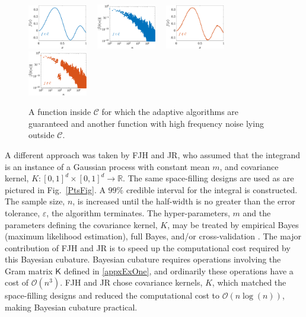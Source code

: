 \documentclass[11pt]{NSFamsart}
\newcommand{\reals}{{\mathbb{R}}}
\newcommand{\mK}{\mathsf{K}}
\newcommand{\cc}{\mathcal{C}}
\newcommand{\Order}{\mathcal{O}}
\begin{document}
\begin{figure}[ht]
	\centering
	\includegraphics[width = 0.23\textwidth] 
	{ProgramsImages/FunctionWalshFourierCoeffDecay.eps} \ \ 
	\includegraphics[width = 0.23\textwidth] 
	{ProgramsImages/WalshFourierCoeffDecay128.eps} \ \ 
	\includegraphics[width = 0.23\textwidth] 
	{ProgramsImages/FilteredFunctionWalshFourierCoeffDecay.eps} \ \ 
	\includegraphics[width = 0.23\textwidth] 
	{ProgramsImages/WalshFourierCoeffDecayFilter.eps}
	\caption{A function inside $\cc$ for which the adaptive algorithms are guaranteed and another function with high frequency noise lying outside $\cc$.
	\label{GoodBadWalshFig}}
\end{figure}
\fi

A different approach was taken by FJH and JR, who assumed that the integrand is an instance of a Gaussian process with constant mean $m$, and covariance kernel, $K:[0,1]^d \times [0,1]^d \to \reals$.  The same space-filling designs are used as are pictured in Fig.\ \ref{PtsFig}.  A $99\%$ credible interval for the integral is constructed.  The sample size, $n$, is increased until the half-width is no greater than the error tolerance, $\varepsilon$, the algorithm terminates.  The hyper-parameters, $m$ and the parameters defining the covariance kernel, $K$, may be treated by empirical Bayes (maximum likelihood estimation), full Bayes, and/or cross-validation \cite{RatHic19a}. The major contribution of FJH and JR is to speed up the computational cost required by this Bayesian cubature.  Bayesian cubature requires operations
involving the Gram matrix $\mK$ defined in \eqref{appxExOne}, and ordinarily these operations  have a cost of
$\Order(n^3)$.  FJH and JR chose covariance kernels, $K$, which matched the space-filling designs and reduced the computational cost to $\Order(n 
\log(n))$, making Bayesian cubature practical.
\end{document}
